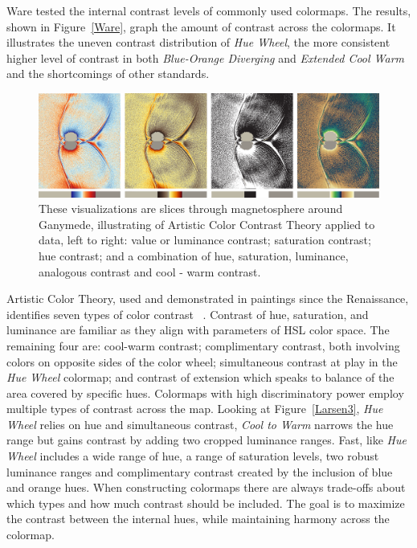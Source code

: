 \documentclass{IEEEcsmag}
\newcommand*{\colormap}[1]{\textsl{#1}\xspace}
\newcommand*{\huewheel}{\colormap{Hue Wheel}}
\newcommand*{\coolwarm}{\colormap{Cool to Warm}}
\newcommand*{\blueorange}{\colormap{Blue-Orange Diverging}}
\begin{document}
Ware tested the internal contrast levels of commonly used colormaps. The results, shown in Figure~\ref{Ware}, graph the amount of contrast across the colormaps. It illustrates the uneven contrast distribution of \huewheel, the more consistent higher level of contrast in both \blueorange and \textit{Extended Cool Warm} and the shortcomings of other standards. 

\begin{figure}[t]
\centering
\includegraphics[width=\textwidth]{Final_Pics/HSV.png}
\caption{These visualizations are slices through magnetosphere around Ganymede, illustrating of Artistic Color Contrast Theory applied to data, left to right:  value or luminance contrast; saturation contrast; hue contrast; and a combination of hue, saturation, luminance, analogous contrast and cool - warm contrast.}
\label{contrast}
\end{figure}

Artistic Color Theory, used and demonstrated in paintings since the Renaissance, identifies seven types of color contrast ~\cite{Itten}.  Contrast of hue, saturation, and luminance are familiar as they align with parameters of HSL color space. The remaining four are: cool-warm contrast; complimentary contrast, both involving colors on opposite sides of the color wheel; simultaneous contrast at play in the \huewheel colormap; and contrast of extension which speaks to balance of the area covered by specific hues. Colormaps with high discriminatory power employ multiple types of contrast across the map. Looking at Figure~\ref{Larsen3}, \huewheel relies on hue and simultaneous contrast, \coolwarm narrows the hue range but gains contrast by adding two cropped luminance ranges. Fast, like \huewheel includes a wide range of hue, a range of saturation levels, two robust luminance ranges and complimentary contrast created by the inclusion of blue and orange hues. When constructing colormaps there are always trade-offs about which types and how much contrast should be included. The goal is to maximize the contrast between the internal hues, while maintaining harmony across the colormap. 
\end{document}
